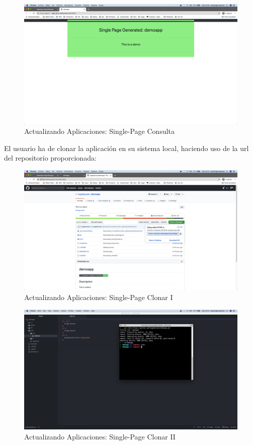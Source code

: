 \documentclass[a4paper,11pt]{book}
\begin{document}
\begin{figure}[H]
\centering
\includegraphics[scale=0.2]{imagenes/casouso/2_2.png}
\caption{  Actualizando Aplicaciones: Single-Page Consulta }
\end{figure}

 El usuario ha de clonar la aplicación en su sistema local, haciendo uso de la url del repositorio proporcionada:
 
 \begin{figure}[H]
\centering
\includegraphics[scale=0.2]{imagenes/casouso/2_3.png}
\caption{  Actualizando Aplicaciones: Single-Page Clonar I }
\end{figure}


\begin{figure}[H]
\centering
\includegraphics[scale=0.2]{imagenes/casouso/2_4.png}
\caption{  Actualizando Aplicaciones: Single-Page Clonar II }
\end{figure}
\end{document}
